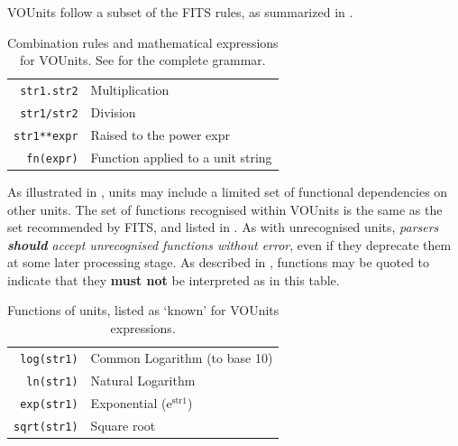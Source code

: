 \documentclass[11pt,a4paper]{ivoa}
\newcommand{\unit}[1]{\texttt{\small\color{orange}#1}}
\newcommand*\norm[1]{\textbf{\color{ivoacolor}#1}}
\begin{document}
VOUnits follow a subset of the FITS rules,
as summarized in .

\begin{table}%
\begin{center}
\def\arraystretch{1.2}
\begin{tabular}{|r|l|}
\hline
\unit{str1.str2} & Multiplication \\
\unit{str1/str2} & Division \\
\unit{str1**expr} & Raised to the power expr \\
\unit{fn(expr)} & Function applied to a unit string\\
\hline
\end{tabular}
\end{center}
 \caption[Combination rules and mathematical expressions for VOUnits]
{\label{tab:VOUnitCombine}Combination rules and mathematical expressions for VOUnits.
See  for the complete grammar.}
\end{table}

As illustrated in , units may include a
limited set of functional dependencies on other units.  The set of
functions recognised within VOUnits is the same as the set recommended
by FITS, and listed in .  As with
unrecognised units,
\emph{parsers \norm{should} accept unrecognised functions without error},
even if they deprecate them at some later processing stage.  As
described in , functions may be quoted to
indicate that they \norm{must not} be interpreted as in this table.
\begin{table}%
\begin{center}
\def\arraystretch{1.2}
\begin{tabular}{|r|l|}
\hline
\unit{log(str1)} & Common Logarithm (to base 10) \\
\unit{ln(str1)} & Natural Logarithm \\
\unit{exp(str1)} & Exponential (e$^{\mathrm{str1}}$) \\
\unit{sqrt(str1)} & Square root \\
\hline
\end{tabular}
\end{center}
\caption{\label{tab:functions}Functions of units, listed as `known'
  for VOUnits expressions.}
\end{table}
\end{document}
